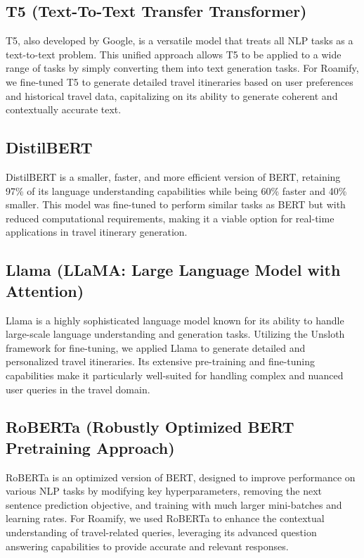 \documentclass[conference]{IEEEtran}
\begin{document}
\subsection{T5 (Text-To-Text Transfer Transformer)}
T5, also developed by Google, is a versatile model that treats all NLP tasks as a text-to-text problem. This unified approach allows T5 to be applied to a wide range of tasks by simply converting them into text generation tasks. For Roamify, we fine-tuned T5 to generate detailed travel itineraries based on user preferences and historical travel data, capitalizing on its ability to generate coherent and contextually accurate text.

\subsection{DistilBERT}
DistilBERT is a smaller, faster, and more efficient version of BERT, retaining 97\% of its language understanding capabilities while being 60\% faster and 40\% smaller. This model was fine-tuned to perform similar tasks as BERT but with reduced computational requirements, making it a viable option for real-time applications in travel itinerary generation.

\subsection{Llama (LLaMA: Large Language Model with Attention)}
Llama is a highly sophisticated language model known for its ability to handle large-scale language understanding and generation tasks. Utilizing the Unsloth framework for fine-tuning, we applied Llama to generate detailed and personalized travel itineraries. Its extensive pre-training and fine-tuning capabilities make it particularly well-suited for handling complex and nuanced user queries in the travel domain.

\subsection{RoBERTa (Robustly Optimized BERT Pretraining Approach)}
RoBERTa is an optimized version of BERT, designed to improve performance on various NLP tasks by modifying key hyperparameters, removing the next sentence prediction objective, and training with much larger mini-batches and learning rates. For Roamify, we used RoBERTa to enhance the contextual understanding of travel-related queries, leveraging its advanced question answering capabilities to provide accurate and relevant responses.
\end{document}
